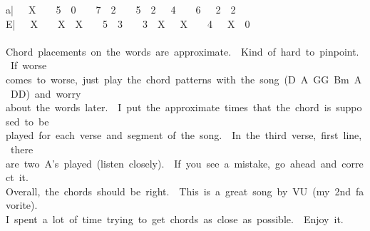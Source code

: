 {a|\ \ \ X\ \ \ \ 5\ \ 0\ \ \ \ 7\ \ 2\ \ \ \ 5\ \ 2\ \ \ 4\ \ \ \ 6\ \ \ 2\ \ 2\\
E|\ \ \ X\ \ \ \ X\ \ X\ \ \ \ 5\ \ 3\ \ \ \ 3\ \ X\ \ \ X\ \ \ \ 4\ \ \ X\ \ 0\\
\\
Chord\ placements\ on\ the\ words\ are\ approximate.\ \ Kind\ of\ hard\ to\ pinpoint.\ \ If\ worse\\
comes\ to\ worse,\ just\ play\ the\ chord\ patterns\ with\ the\ song\ (D\ A\ GG\ Bm\ A\ DD)\ and\ worry\\
about\ the\ words\ later.\ \ I\ put\ the\ approximate\ times\ that\ the\ chord\ is\ supposed\ to\ be\\
played\ for\ each\ verse\ and\ segment\ of\ the\ song.\ \ In\ the\ third\ verse,\ first\ line,\ there\\
are\ two\ A's\ played\ (listen\ closely).\ \ If\ you\ see\ a\ mistake,\ go\ ahead\ and\ correct\ it.\ \\
Overall,\ the\ chords\ should\ be\ right.\ \ This\ is\ a\ great\ song\ by\ VU\ (my\ 2nd\ favorite).\\
I\ spent\ a\ lot\ of\ time\ trying\ to\ get\ chords\ as\ close\ as\ possible.\ \ Enjoy\ it.}
